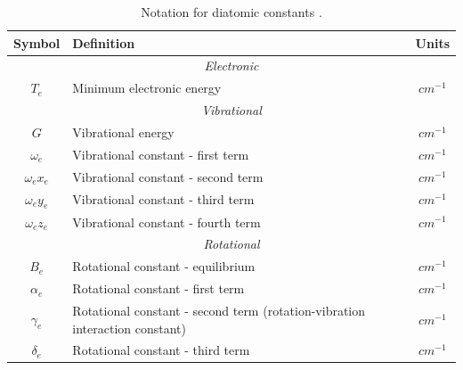 \documentclass[11pt, twoside, fleqn]{report}
\begin{document}
\begin{table}[H]
    \centering
    \caption{Notation for diatomic constants \cite{herzberg:diatomic,nist:sigma1,nist:sigma3}.}
    \label{t:notation}
    \begin{tabular}{clc}
        \toprule
        Symbol        & Definition                                                                  & Units            \\
        \midrule
        \multicolumn{3}{c}{\textit{Electronic}}                                                                        \\
        \cmidrule(lr){1-3}
        $T_e$         & Minimum electronic energy                                                   & $\unit{cm^{-1}}$ \\
        \multicolumn{3}{c}{\textit{Vibrational}}                                                                       \\
        \cmidrule(lr){1-3}
        $G$           & Vibrational energy                                                          & $\unit{cm^{-1}}$ \\
        $\omega_e$    & Vibrational constant - first term                                           & $\unit{cm^{-1}}$ \\
        $\omega_ex_e$ & Vibrational constant - second term                                          & $\unit{cm^{-1}}$ \\
        $\omega_ey_e$ & Vibrational constant - third term                                           & $\unit{cm^{-1}}$ \\
        $\omega_ez_e$ & Vibrational constant - fourth term                                          & $\unit{cm^{-1}}$ \\
        \multicolumn{3}{c}{\textit{Rotational}}                                                                        \\
        \cmidrule(lr){1-3}
        $B_e$         & Rotational constant - equilibrium                                           & $\unit{cm^{-1}}$ \\
        $\alpha_e$    & Rotational constant - first term                                            & $\unit{cm^{-1}}$ \\
        $\gamma_e$    & Rotational constant - second term (rotation-vibration interaction constant) & $\unit{cm^{-1}}$ \\
        $\delta_e$    & Rotational constant - third term                                            & $\unit{cm^{-1}}$ \\

\end{tabular}
\end{table}
\end{document}
